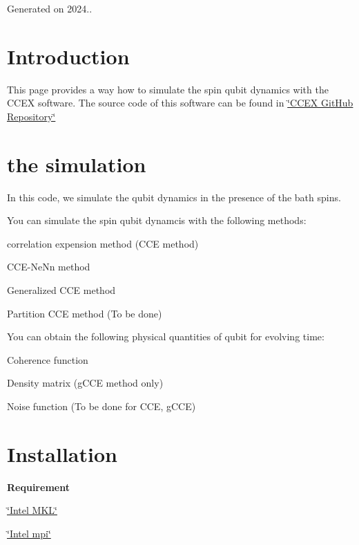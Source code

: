 Generated on 2024..\hypertarget{index_Introduction}{}\section{Introduction}\label{index_Introduction}
This page provides a way how to simulate the spin qubit dynamics with the C\-C\-E\-X software. The source code of this software can be found in \hyperlink{}{\char`\"{}\-C\-C\-E\-X Git\-Hub Repository\char`\"{} }\hypertarget{index_About}{}\section{the simulation}\label{index_About}
In this code, we simulate the qubit dynamics in the presence of the bath spins.

You can simulate the spin qubit dynamcis with the following methods\-:
\begin{DoxyItemize}
\item correlation expension method (C\-C\-E method)
\item C\-C\-E-\/\-Ne\-Nn method
\item Generalized C\-C\-E method
\item Partition C\-C\-E method (To be done)
\end{DoxyItemize}

You can obtain the following physical quantities of qubit for evolving time\-:
\begin{DoxyItemize}
\item Coherence function
\item Density matrix (g\-C\-C\-E method only)
\item Noise function (To be done for C\-C\-E, g\-C\-C\-E)
\end{DoxyItemize}\hypertarget{index_Installation}{}\section{Installation}\label{index_Installation}



{\bfseries Requirement} {\bfseries } 
\begin{DoxyItemize}
\item \hyperlink{}{\char`\"{}\-Intel M\-K\-L\char`\"{} }
\item \hyperlink{}{\char`\"{}\-Intel mpi\char`\"{} }
\end{DoxyItemize}


